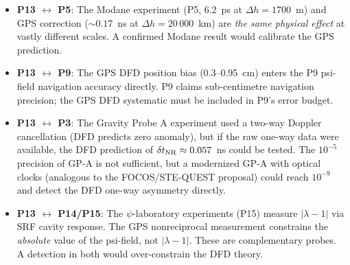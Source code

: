 \documentclass[aps,prd,twocolumn,superscriptaddress,nofootinbib]{revtex4-2}
\begin{document}
\begin{itemize}
\item \textbf{P13 $\leftrightarrow$ P5}: The Modane experiment (P5, 6.2~ps
      at $\Delta h = 1700$~m) and GPS correction ($\sim 0.17$~ns at
      $\Delta h = 20\,000$~km) are \emph{the same physical effect} at vastly
      different scales. A confirmed Modane result would calibrate the GPS prediction.

\item \textbf{P13 $\leftrightarrow$ P9}: The GPS DFD position bias (0.3--0.95~cm)
      enters the P9 psi-field navigation accuracy directly. P9 claims sub-centimetre
      navigation precision; the GPS DFD systematic must be included in P9's error
      budget.

\item \textbf{P13 $\leftrightarrow$ P3}: The Gravity Probe A experiment used a
      two-way Doppler cancellation (DFD predicts zero anomaly), but if the raw
      one-way data were available, the DFD prediction of $\delta t_{\rm NR}
      \approx 0.057$~ns could be tested. The $10^{-5}$ precision of GP-A is
      not sufficient, but a modernized GP-A with optical clocks (analogous to
      the FOCOS/STE-QUEST proposal) could reach $10^{-9}$ and detect the DFD
      one-way asymmetry directly.

\item \textbf{P13 $\leftrightarrow$ P14/P15}: The $\psi$-laboratory experiments
      (P15) measure $|\lambda-1|$ via SRF cavity response. The GPS nonreciprocal
      measurement constrains the \emph{absolute} value of the psi-field, not
      $|\lambda-1|$. These are complementary probes. A detection in both would
      over-constrain the DFD theory.
\end{itemize}
\end{document}
